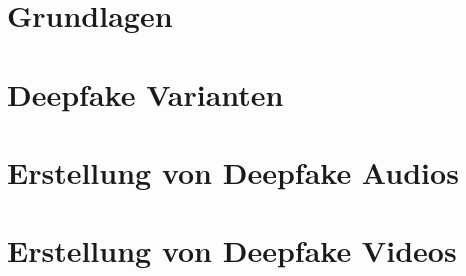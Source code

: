 % 
\chapter{Grundlagen}\label{ch:grundlagen}




\chapter{Deepfake Varianten}\label{ch:deepfake-varianten}



\chapter{Erstellung von Deepfake Audios}\label{ch:erstellung-von-deepfake-audios}



\chapter{Erstellung von Deepfake Videos}\label{ch:erstellung-von-deepfake-videos}





